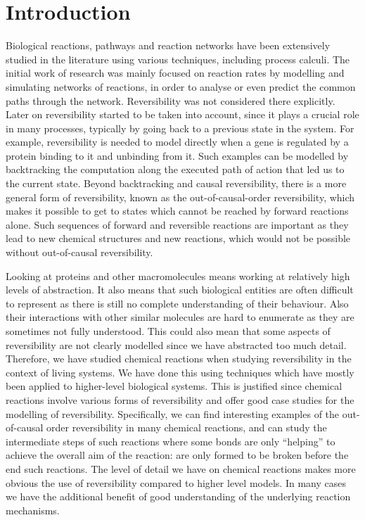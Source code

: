 \documentclass[runningheads]{llncs}
\begin{document}
\section{Introduction}

Biological reactions, pathways and reaction networks have been extensively studied in the literature using
various  techniques,  including  process  calculi.  The initial work of research was mainly focused  on
reaction rates by modelling and simulating networks of reactions, in order to
analyse or even predict the common paths through the network.  Reversibility
was not considered there explicitly.  Later on
reversibility  started  to  be  taken  into  account,  since  it  plays  a  crucial  role  in
many processes, typically by going back to a previous state in the system.  For
example,  reversibility is needed to model directly when a gene is regulated by a protein binding to it and unbinding from it.  Such examples can
be modelled by backtracking the computation along the executed path of action that led us to the current state.  Beyond
backtracking and causal reversibility, there is a more general form of reversibility, known as the out-of-causal-order reversibility, which makes it possible to get
to states which cannot be reached by forward reactions alone.  Such sequences
of forward and reversible reactions are important as they lead to new chemical
structures and new reactions, which would not be possible without out-of-causal
reversibility.

Looking at proteins and other macromolecules means working at relatively
high  levels  of  abstraction.   It  also  means  that  such  biological  entities  are  often  difficult  to  represent  as  there  is  still  no  complete  understanding  of  their
behaviour.  Also their interactions with other similar molecules are hard to enumerate as they are sometimes not fully understood. This could also mean that some aspects of reversibility are not clearly modelled since we have abstracted too  much  detail. Therefore,  we  have studied chemical  reactions  when studying reversibility in the context of living systems. We have done this using techniques which have mostly been applied to higher-level biological systems. This is justified since chemical reactions involve various forms of reversibility and offer good case
studies  for  the  modelling  of  reversibility. Specifically,  we  can  find  interesting
examples  of  the  out-of-causal  order  reversibility  in  many  chemical  reactions,
and can study the intermediate steps of such reactions where some bonds are
only “helping” to achieve the overall aim of the reaction:  are only formed to be
broken before the end such reactions.  The level of detail we have on
chemical  reactions  makes more obvious the use of  reversibility compared to higher level models.  In many cases we have the additional benefit of good
understanding of the underlying reaction mechanisms.
\end{document}
